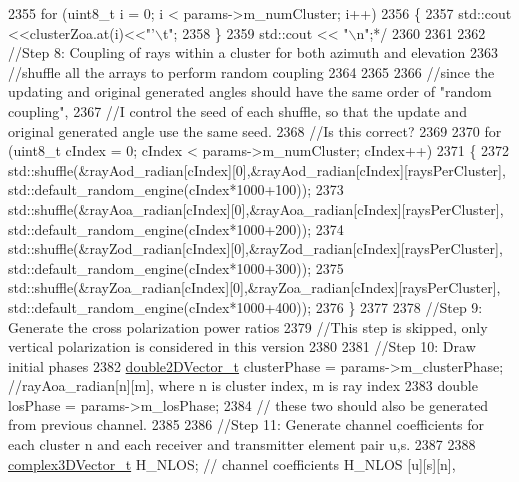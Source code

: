 \begin{DoxyCode}
2355 \textcolor{comment}{        for (uint8\_t i = 0; i < params->m\_numCluster; i++)}
2356 \textcolor{comment}{        \{}
2357 \textcolor{comment}{                std::cout <<clusterZoa.at(i)<<"'\(\backslash\)t";}
2358 \textcolor{comment}{        \}}
2359 \textcolor{comment}{        std::cout << "\(\backslash\)n";*/}
2360 
2361 
2362         \textcolor{comment}{//Step 8: Coupling of rays within a cluster for both azimuth and elevation}
2363         \textcolor{comment}{//shuffle all the arrays to perform random coupling}
2364 
2365 
2366         \textcolor{comment}{//since the updating and original generated angles should have the same order of "random coupling",}
2367         \textcolor{comment}{//I control the seed of each shuffle, so that the update and original generated angle use the same
       seed.}
2368         \textcolor{comment}{//Is this correct?}
2369 
2370         \textcolor{keywordflow}{for} (uint8\_t cIndex = 0; cIndex < params->m\_numCluster; cIndex++)
2371         \{
2372                 std::shuffle(&rayAod\_radian[cIndex][0],&rayAod\_radian[cIndex][raysPerCluster],
      std::default\_random\_engine(cIndex*1000+100));
2373                 std::shuffle(&rayAoa\_radian[cIndex][0],&rayAoa\_radian[cIndex][raysPerCluster],
      std::default\_random\_engine(cIndex*1000+200));
2374                 std::shuffle(&rayZod\_radian[cIndex][0],&rayZod\_radian[cIndex][raysPerCluster],
      std::default\_random\_engine(cIndex*1000+300));
2375                 std::shuffle(&rayZoa\_radian[cIndex][0],&rayZoa\_radian[cIndex][raysPerCluster],
      std::default\_random\_engine(cIndex*1000+400));
2376         \}
2377 
2378         \textcolor{comment}{//Step 9: Generate the cross polarization power ratios}
2379         \textcolor{comment}{//This step is skipped, only vertical polarization is considered in this version}
2380 
2381         \textcolor{comment}{//Step 10: Draw initial phases}
2382         \hyperlink{namespacens3_a908ae777c72964ccedbcf2310527a67e}{double2DVector\_t} clusterPhase = params->m\_clusterPhase; \textcolor{comment}{//rayAoa\_radian[n][m],
       where n is cluster index, m is ray index}
2383         \textcolor{keywordtype}{double} losPhase = params->m\_losPhase;
2384         \textcolor{comment}{// these two should also be generated from previous channel.}
2385 
2386         \textcolor{comment}{//Step 11: Generate channel coefficients for each cluster n and each receiver and transmitter
       element pair u,s.}
2387 
2388         \hyperlink{namespacens3_afbc512ea4e4657e80b7ac44f78fc81ad}{complex3DVector\_t} H\_NLOS; \textcolor{comment}{// channel coefficients H\_NLOS [u][s][n],}

\end{DoxyCode}
